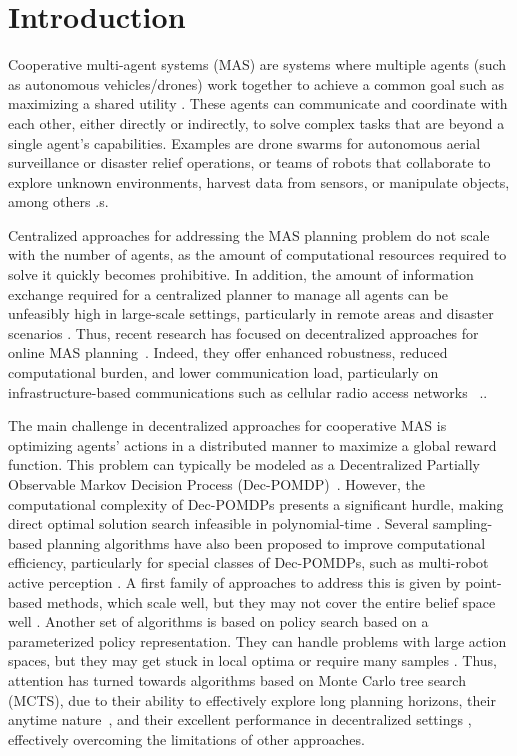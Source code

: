 \section{Introduction}

Cooperative multi-agent systems (MAS) are systems where multiple agents (such as autonomous vehicles/drones) work together to achieve a common goal such as maximizing a shared utility \citep{dorri2018multi}. These agents can communicate and coordinate with each other, either directly or indirectly, to solve complex tasks that are beyond a single agent's capabilities. Examples are drone swarms for autonomous aerial surveillance or disaster relief operations, or teams of robots that collaborate to explore unknown environments, harvest data from sensors, or manipulate objects, among others \citep{xie2017multi}.s.

Centralized approaches for addressing the MAS planning problem do not scale with the number of agents, as the amount of computational resources required to solve it quickly becomes prohibitive. In addition, the amount of information exchange required for a centralized planner to manage all agents can be unfeasibly high in large-scale settings, particularly in remote areas and disaster scenarios \citep{trodden2009robust}. Thus, recent research has focused on decentralized approaches for online MAS planning~\citep{zhang2021multi}. Indeed, they offer enhanced robustness, reduced computational burden, and lower communication load, particularly on infrastructure-based communications such as cellular radio access networks ~\citep{claes2017decentralised}.. 

The main challenge in decentralized approaches for cooperative MAS is optimizing agents' actions in a distributed manner to maximize a global reward function. This problem can typically be modeled as a Decentralized Partially Observable Markov Decision Process (Dec-POMDP)~\citep{oliehoek2016concise}. However, the computational complexity of Dec-POMDPs presents a significant hurdle, making direct optimal solution search infeasible in polynomial-time \citep{bernstein2002complexity}.
Several sampling-based planning algorithms have also been proposed to improve computational efficiency, particularly for special classes of Dec-POMDPs, such as multi-robot active perception \citep{zhang2021multi}.
A first family of approaches to address this is given by point-based methods, which scale well, but they may not cover the entire belief space well \citep{POINT_pineau2003point,POINT_shani2013survey}. Another set of algorithms is based on policy search \citep{POLICY_seuken2011memory, POLICY_amato2010optimizing} based on a parameterized policy representation. They can handle problems with large action spaces, but they may get stuck in local optima or require many samples
\citep{POLICY_amato2010optimizing}.
Thus, attention has turned towards algorithms based on Monte Carlo tree search (MCTS), due to their ability to effectively explore long planning horizons, their anytime nature~\citep{kocsis2006improved}, and their excellent performance in decentralized settings \citep{claes2017decentralised, best2019dec, czechowski2020decentralized}, effectively overcoming the limitations of other approaches.

